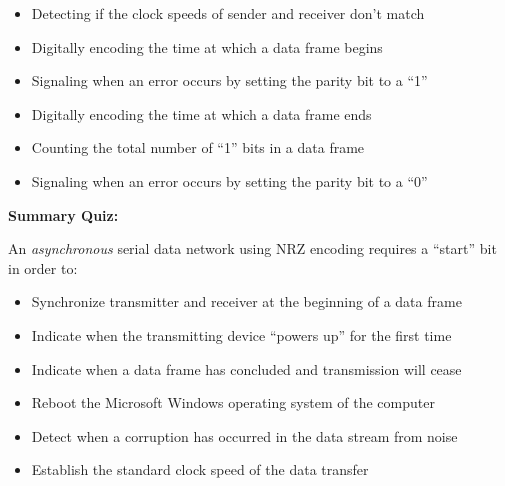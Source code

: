 \begin{itemize}
\item{} Detecting if the clock speeds of sender and receiver don't match
\vskip 5pt 
\item{} Digitally encoding the time at which a data frame begins
\vskip 5pt 
\item{} Signaling when an error occurs by setting the parity bit to a ``1''
\vskip 5pt 
\item{} Digitally encoding the time at which a data frame ends 
\vskip 5pt 
\item{} Counting the total number of ``1'' bits in a data frame
\vskip 5pt 
\item{} Signaling when an error occurs by setting the parity bit to a ``0''
\end{itemize}






\vfil \eject

\noindent
{\bf Summary Quiz:}

An {\it asynchronous} serial data network using NRZ encoding requires a ``start'' bit in order to:

\begin{itemize}
\item{} Synchronize transmitter and receiver at the beginning of a data frame
\vskip 5pt 
\item{} Indicate when the transmitting device ``powers up'' for the first time
\vskip 5pt 
\item{} Indicate when a data frame has concluded and transmission will cease
\vskip 5pt 
\item{} Reboot the Microsoft Windows operating system of the computer
\vskip 5pt 
\item{} Detect when a corruption has occurred in the data stream from noise
\vskip 5pt 
\item{} Establish the standard clock speed of the data transfer
\end{itemize}




